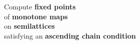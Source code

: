 \documentclass{beamer}
\begin{document}


\begin{frame}
  \Large Compute \textbf{fixed points}\\of \textbf{monotone maps}\\on
  \textbf{semilattices}\\ satisfying an \textbf{ascending chain condition}
\end{frame}
\end{document}
